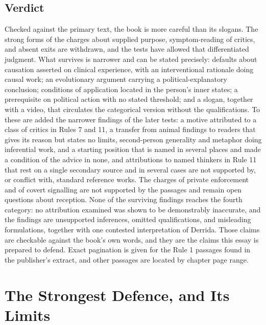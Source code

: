 \documentclass[12pt]{article}
\begin{document}
\subsection*{Verdict}

Checked against the primary text, the book is more careful than its slogans. The strong forms of the charges about supplied purpose, symptom-reading of critics, and absent exits are withdrawn, and the tests have allowed that differentiated judgment. What survives is narrower and can be stated precisely: defaults about causation asserted on clinical experience, with an interventional rationale doing causal work; an evolutionary argument carrying a political-explanatory conclusion; conditions of application located in the person's inner states; a prerequisite on political action with no stated threshold; and a slogan, together with a video, that circulates the categorical version without the qualifications. To these are added the narrower findings of the later tests: a motive attributed to a class of critics in Rules 7 and 11, a transfer from animal findings to readers that gives its reason but states no limits, second-person generality and metaphor doing inferential work, and a starting position that is named in several places and made a condition of the advice in none, and attributions to named thinkers in Rule 11 that rest on a single secondary source and in several cases are not supported by, or conflict with, standard reference works. The charges of private enforcement and of covert signalling are not supported by the passages and remain open questions about reception. None of the surviving findings reaches the fourth category: no attribution examined was shown to be demonstrably inaccurate, and the findings are unsupported inferences, omitted qualifications, and misleading formulations, together with one contested interpretation of Derrida. Those claims are checkable against the book's own words, and they are the claims this essay is prepared to defend. Exact pagination is given for the Rule 1 passages found in the publisher's extract, and other passages are located by chapter page range.

\section{The Strongest Defence, and Its Limits}\label{sec:defence}
\end{document}
